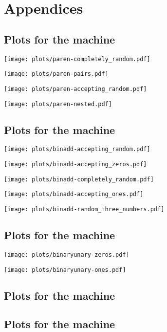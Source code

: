 \section{Appendices}
\subsection{Plots for the  machine}
\label{plots_paren}
\begin{center}\texttt{[image: plots/paren-completely\_random.pdf]}\end{center}
\begin{center}\texttt{[image: plots/paren-pairs.pdf]}\end{center}
\begin{center}\texttt{[image: plots/paren-accepting\_random.pdf]}\end{center}
\begin{center}\texttt{[image: plots/paren-nested.pdf]}\end{center}
\subsection{Plots for the  machine}
\label{plots_binadd}
\begin{center}\texttt{[image: plots/binadd-accepting\_random.pdf]}\end{center}
\begin{center}\texttt{[image: plots/binadd-accepting\_zeros.pdf]}\end{center}
\begin{center}\texttt{[image: plots/binadd-completely\_random.pdf]}\end{center}
\begin{center}\texttt{[image: plots/binadd-accepting\_ones.pdf]}\end{center}
\begin{center}\texttt{[image: plots/binadd-random\_three\_numbers.pdf]}\end{center}
\subsection{Plots for the  machine}
\label{plots_binaryunary}
\begin{center}\texttt{[image: plots/binaryunary-zeros.pdf]}\end{center}
\begin{center}\texttt{[image: plots/binaryunary-ones.pdf]}\end{center}
\subsection{Plots for the  machine}
\label{plots_subword}
\subsection{Plots for the  machine}
\label{plots_subword_fast}
